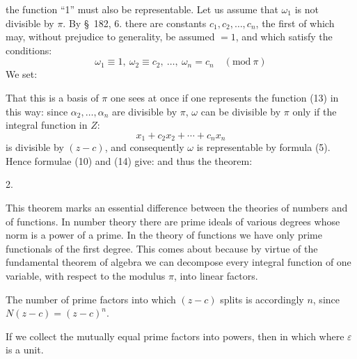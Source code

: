 the function ``1'' must also be representable. Let us assume that
$\omega_1$ is not divisible by $\pi$. By \S\ 182, 6. there are constants
$c_1, c_2, \ldots, c_n$, the first of which may, without prejudice to generality, be
assumed $= 1$, and which satisfy the conditions:
\[
\omega_1 \equiv 1, \ \omega_2 \equiv c_2, \ \ldots, \ \omega_n = c_n \quad (\mathrm{mod}\ \pi)
\]
We set:

That this is a basis of $\pi$ one sees at once if one represents
the function (13) in this way:
since $\alpha_2, \ldots, \alpha_n$ are divisible by $\pi$, $\omega$ can be divisible by
$\pi$ only if the integral function in $Z$:
\[
x_1 + c_2x_2 + \cdots + c_nx_n
\]
is divisible by $(z - c)$, and consequently $\omega$ is representable by formula (5).
Hence formulae (10) and (14) give:
and thus the theorem:

2. 

This theorem marks an essential difference between
the theories of numbers and of functions. In number theory
 there are prime ideals of various degrees whose norm is a
power of a prime. In the theory of functions we have
only prime functionals of the first degree. This comes about because
by virtue of the fundamental theorem of algebra we can decompose every integral
function of one variable, with respect to the modulus $\pi$, into linear
factors.

The number of prime factors into which $(z - c)$ splits is accordingly
 $n$, since $N(z-c) = (z-c)^n$.

If we collect the mutually equal prime factors into
powers, then
in which
where $\varepsilon$ is a unit.
